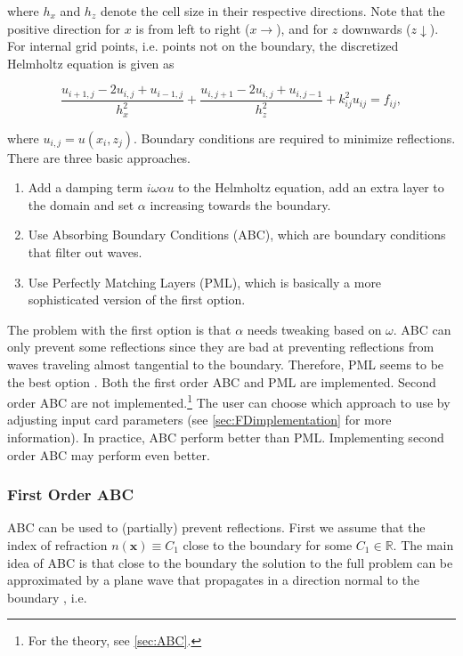 \documentclass[10pt,a4paper]{article}
\newcommand{\x}{\mathbf{x}}
\begin{document}
where $h_x$ and $h_z$ denote the cell size in their respective directions. Note that the positive direction for $x$ is from left to right ($x\rightarrow$), and for $z$ downwards ($z\downarrow$). For internal grid points, i.e. points not on the boundary, the discretized Helmholtz equation is given as 

\begin{equation} \label{eqn:discret}
\frac{u_{i+1,j}-2u_{i,j}+u_{i-1,j}}{h_x^2} + \frac{u_{i,j+1}-2u_{i,j}+u_{i,j-1}}{h_z^2} + k_{ij}^2u_{ij}= f_{ij},
\end{equation}

where $u_{i,j}=u(x_i,z_j)$. Boundary conditions are required to minimize reflections. There are three basic approaches.
\begin{enumerate}
	\item Add a damping term $i\omega\alpha u$ to the Helmholtz equation, add an extra layer to the domain and set $\alpha$ increasing towards the boundary.
	\item Use Absorbing Boundary Conditions (ABC), which are boundary conditions that filter out waves.
	\item Use Perfectly Matching Layers (PML), which is basically a more sophisticated version of the first option.
\end{enumerate}

The problem with the first option is that $\alpha$ needs tweaking based on $\omega$. ABC can only prevent some reflections since they are bad at preventing reflections from waves traveling almost tangential to the boundary. Therefore, PML seems to be the best option \cite{Comparison}. Both the first order ABC and PML are implemented. Second order ABC are not implemented.\footnote{For the theory, see \cref{sec:ABC}.} The user can choose which approach to use by adjusting input card parameters (see \cref{sec:FDimplementation} for more information). In practice, ABC perform better than PML. Implementing second order ABC may perform even better.

\subsubsection{First Order ABC}
ABC can be used to (partially) prevent reflections. First we assume that the index of refraction $n(\x)\equiv C_1$ close to the boundary for some $C_1\in \mathbb{R}$. The main idea of ABC is that close to the boundary the solution to the full problem can be approximated by a plane wave that propagates in a direction normal to the boundary \cite{LectNotes}, i.e.
\end{document}
